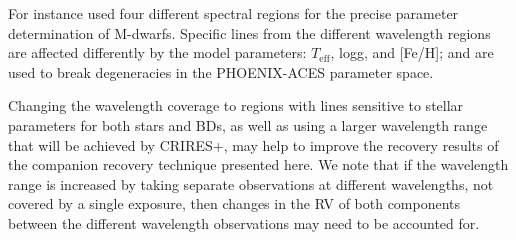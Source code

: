 For instance \citet{passegger_fundamental_2016} used four different spectral regions for the precise parameter determination of M-dwarfs. Specific lines from the different wavelength regions are affected differently by the model parameters: \(T_{\textrm{eff}}\), logg, and [Fe/H]; and are used to break degeneracies in the PHOENIX-ACES parameter space. 

Changing the wavelength coverage to regions with lines sensitive to stellar parameters for both stars and BDs, as well as using a larger wavelength range that will be achieved by CRIRES+, may help to improve the recovery results of the companion recovery technique presented here. We note that if the wavelength range is increased by taking separate observations at different wavelengths, not covered by a single exposure, then changes in the RV of both components between the different wavelength observations may need to be accounted for. 
